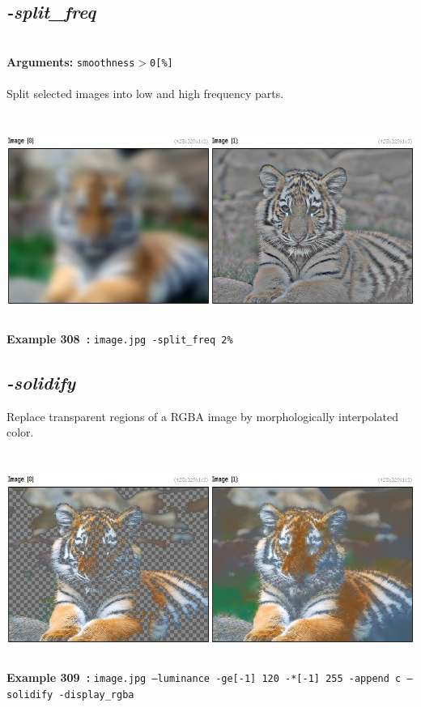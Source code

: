\documentclass[a4paper,11pt,twoside]{book}
\begin{document}
\subsection{\emph{-split\_freq} }\vspace*{-0.5em}
~\\\textbf{Arguments: } 
{\small \texttt{smoothness$>$0[\%]}}\\~\\
Split selected images into low and high frequency parts.
\begin{center}\includegraphics[keepaspectratio=true,height=7cm,width=\textwidth]{img/gmic_def308.jpg}\\
{\footnotesize \textbf{Example 308~:} \texttt{image.jpg -split\_freq 2\%}}
\end{center}

\subsection{\emph{-solidify} }\vspace*{-0.5em}
Replace transparent regions of a RGBA image by morphologically interpolated color.
\begin{center}\includegraphics[keepaspectratio=true,height=7cm,width=\textwidth]{img/gmic_def309.jpg}\\
{\footnotesize \textbf{Example 309~:} \texttt{image.jpg --luminance -ge[-1] 120 -*[-1] 255 -append c --solidify -display\_rgba}}
\end{center}
\end{document}
